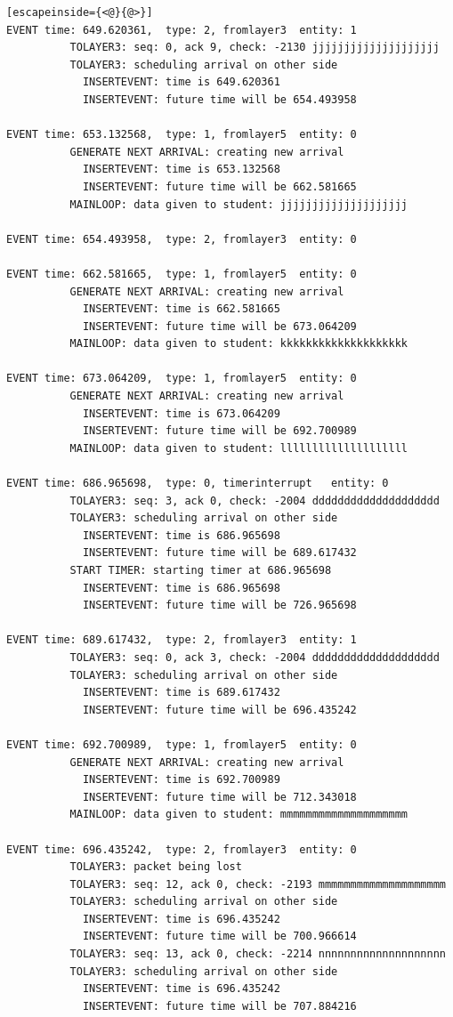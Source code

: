 \documentclass[paper=a4, fontsize=11pt]{scrartcl}
\numberwithin{equation}{section}		%
\numberwithin{figure}{section}			%
\numberwithin{table}{section}				%
\begin{document}
\begin{lstlisting}[escapeinside={<@}{@>}]
EVENT time: 649.620361,  type: 2, fromlayer3  entity: 1
          TOLAYER3: seq: 0, ack 9, check: -2130 jjjjjjjjjjjjjjjjjjjj
          TOLAYER3: scheduling arrival on other side
            INSERTEVENT: time is 649.620361
            INSERTEVENT: future time will be 654.493958

EVENT time: 653.132568,  type: 1, fromlayer5  entity: 0
          GENERATE NEXT ARRIVAL: creating new arrival
            INSERTEVENT: time is 653.132568
            INSERTEVENT: future time will be 662.581665
          MAINLOOP: data given to student: jjjjjjjjjjjjjjjjjjjj

EVENT time: 654.493958,  type: 2, fromlayer3  entity: 0

EVENT time: 662.581665,  type: 1, fromlayer5  entity: 0
          GENERATE NEXT ARRIVAL: creating new arrival
            INSERTEVENT: time is 662.581665
            INSERTEVENT: future time will be 673.064209
          MAINLOOP: data given to student: kkkkkkkkkkkkkkkkkkkk

EVENT time: 673.064209,  type: 1, fromlayer5  entity: 0
          GENERATE NEXT ARRIVAL: creating new arrival
            INSERTEVENT: time is 673.064209
            INSERTEVENT: future time will be 692.700989
          MAINLOOP: data given to student: llllllllllllllllllll

EVENT time: 686.965698,  type: 0, timerinterrupt   entity: 0
          TOLAYER3: seq: 3, ack 0, check: -2004 dddddddddddddddddddd
          TOLAYER3: scheduling arrival on other side
            INSERTEVENT: time is 686.965698
            INSERTEVENT: future time will be 689.617432
          START TIMER: starting timer at 686.965698
            INSERTEVENT: time is 686.965698
            INSERTEVENT: future time will be 726.965698

EVENT time: 689.617432,  type: 2, fromlayer3  entity: 1
          TOLAYER3: seq: 0, ack 3, check: -2004 dddddddddddddddddddd
          TOLAYER3: scheduling arrival on other side
            INSERTEVENT: time is 689.617432
            INSERTEVENT: future time will be 696.435242

EVENT time: 692.700989,  type: 1, fromlayer5  entity: 0
          GENERATE NEXT ARRIVAL: creating new arrival
            INSERTEVENT: time is 692.700989
            INSERTEVENT: future time will be 712.343018
          MAINLOOP: data given to student: mmmmmmmmmmmmmmmmmmmm

EVENT time: 696.435242,  type: 2, fromlayer3  entity: 0
          TOLAYER3: packet being lost
          TOLAYER3: seq: 12, ack 0, check: -2193 mmmmmmmmmmmmmmmmmmmm
          TOLAYER3: scheduling arrival on other side
            INSERTEVENT: time is 696.435242
            INSERTEVENT: future time will be 700.966614
          TOLAYER3: seq: 13, ack 0, check: -2214 nnnnnnnnnnnnnnnnnnnn
          TOLAYER3: scheduling arrival on other side
            INSERTEVENT: time is 696.435242
            INSERTEVENT: future time will be 707.884216


\end{lstlisting}
\end{document}
